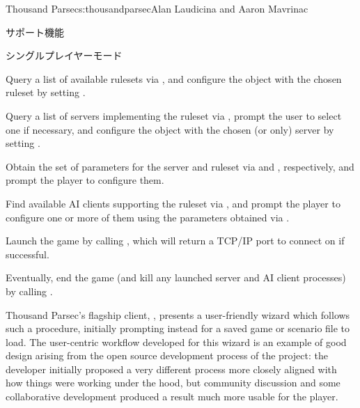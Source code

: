 \begin{aosachapter}{Thousand Parsec}{s:thousandparsec}{Alan Laudicina and Aaron Mavrinac}
\begin{aosasect1}{サポート機能}
\begin{aosasect2}{シングルプレイヤーモード}
\begin{aosaenumerate}
  \item Query a list of available rulesets via
  , and configure the object with
  the chosen ruleset by setting .

  \item Query a list of servers implementing the ruleset via
  , prompt the
  user to select one if necessary, and configure the object with the
  chosen (or only) server by setting .

  \item Obtain the set of parameters for the server and ruleset via
   and
  , respectively, and prompt
  the player to configure them.

  \item Find available AI clients supporting the ruleset
  via , and
  prompt the player to configure one or more of them using the
  parameters obtained via .

  \item Launch the game by calling ,
  which will return a TCP/IP port to connect on if successful.

  \item Eventually, end the game (and kill any launched server and AI
  client processes) by calling .

\end{aosaenumerate}

Thousand Parsec's flagship client, , presents a
user-friendly wizard which follows such a procedure, initially
prompting instead for a saved game or scenario file to load. The
user-centric workflow developed for this wizard is an example of good
design arising from the open source development process of the
project: the developer initially proposed a very different process
more closely aligned with how things were working under the hood, but
community discussion and some collaborative development produced a
result much more usable for the player.


\end{aosasect2}
\end{aosasect1}
\end{aosachapter}
